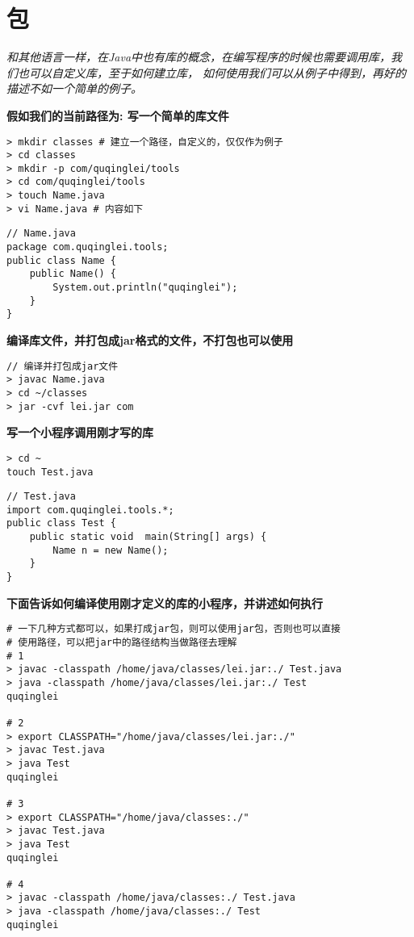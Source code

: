 \documentclass{article}
\begin{document}
\section{包}
\textit{
和其他语言一样，在Java中也有库的概念，在编写程序的时候也需要调用库，我们也可以自定义库，至于如何建立库，
如何使用我们可以从例子中得到，再好的描述不如一个简单的例子。
}

\textbf{假如我们的当前路径为: 写一个简单的库文件}
\begin{verbatim}
> mkdir classes # 建立一个路径，自定义的，仅仅作为例子
> cd classes 
> mkdir -p com/quqinglei/tools
> cd com/quqinglei/tools
> touch Name.java
> vi Name.java # 内容如下
\end{verbatim}

\begin{verbatim}
// Name.java
package com.quqinglei.tools;
public class Name {
	public Name() {
		System.out.println("quqinglei");
	}
}
\end{verbatim}

\textbf{编译库文件，并打包成jar格式的文件，不打包也可以使用}
\begin{verbatim}
// 编译并打包成jar文件
> javac Name.java
> cd ~/classes
> jar -cvf lei.jar com

\end{verbatim}

\textbf{写一个小程序调用刚才写的库}
\begin{verbatim}
> cd ~
touch Test.java
\end{verbatim}

\begin{verbatim}
// Test.java
import com.quqinglei.tools.*;
public class Test {
	public static void  main(String[] args) {
		Name n = new Name();
	}
}
\end{verbatim}

\textbf{下面告诉如何编译使用刚才定义的库的小程序，并讲述如何执行}

\begin{verbatim}
# 一下几种方式都可以，如果打成jar包，则可以使用jar包，否则也可以直接
# 使用路径，可以把jar中的路径结构当做路径去理解
# 1
> javac -classpath /home/java/classes/lei.jar:./ Test.java
> java -classpath /home/java/classes/lei.jar:./ Test
quqinglei

# 2
> export CLASSPATH="/home/java/classes/lei.jar:./"
> javac Test.java
> java Test
quqinglei

# 3
> export CLASSPATH="/home/java/classes:./"
> javac Test.java
> java Test
quqinglei

# 4
> javac -classpath /home/java/classes:./ Test.java
> java -classpath /home/java/classes:./ Test
quqinglei
\end{verbatim}
\end{document}
